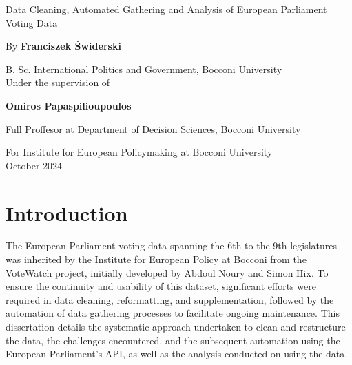 \documentclass{article}
\begin{document}
    \begin{titlepage}
        \centering

        {\Huge Data Cleaning, Automated Gathering and Analysis of European Parliament Voting Data\\}

        \vspace{1cm}

        {By \textbf{Franciszek Świderski}\\}

        \vspace{1cm}

        {B. Sc. International Politics and Government, Bocconi University\\}
        \vspace{1cm}
        {Under the supervision of\\}
        \vspace{1cm}

        {\textbf{Omiros Papaspilioupoulos}\\}

        \vspace{1cm}
        {Full Proffesor at Department of Decision Sciences, Bocconi University\\}
        \vspace{1cm}

        {For Institute for European Policymaking at Bocconi University\\}
        \vspace{1cm}
        {October 2024\\}

        \vspace{5cm} %


    \end{titlepage}


    \section{Introduction}

    The European Parliament voting data spanning the 6th to the 9th legislatures was inherited by the Institute for
    European Policy at Bocconi from the VoteWatch project, initially developed by Abdoul Noury and Simon Hix. To ensure
    the continuity and usability of this dataset, significant efforts were required in data cleaning, reformatting, and
    supplementation, followed by the automation of data gathering processes to facilitate ongoing maintenance. This
    dissertation details the systematic approach undertaken to clean and restructure the data, the challenges
    encountered, and the subsequent automation using the European Parliament's API, as well as the analysis conducted on
    using the data.
\end{document}
